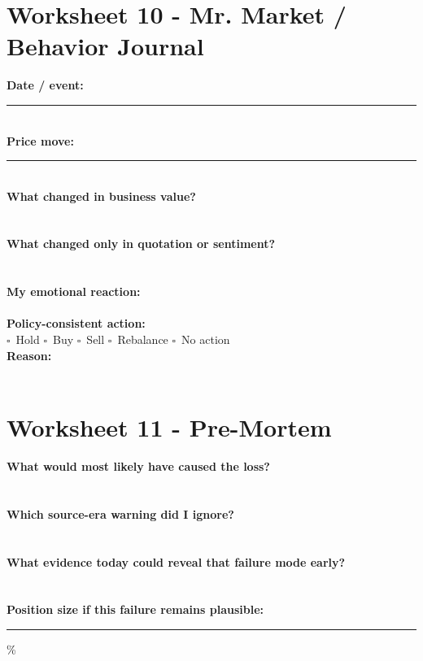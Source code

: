 \documentclass[11pt]{article}
\newcommand{\checkbox}{\(\square\)}
\newcommand{\blankline}{\makebox[\linewidth][l]{\rule{0.96\linewidth}{0.35pt}}}
\begin{document}
\section{Worksheet 10 - Mr. Market / Behavior Journal}
\begin{worksheetbox}
\textbf{Date / event:} \rule{0.72\linewidth}{0.35pt}\\[8pt]
\textbf{Price move:} \rule{0.74\linewidth}{0.35pt}\\[8pt]
\textbf{What changed in business value?}\\[4pt]\blankline\\[10pt]\blankline\\[10pt]
\textbf{What changed only in quotation or sentiment?}\\[4pt]\blankline\\[10pt]\blankline\\[10pt]
\textbf{My emotional reaction:}\\[4pt]\blankline\\[10pt]
\textbf{Policy-consistent action:}\\[4pt]\checkbox\ Hold \quad \checkbox\ Buy \quad \checkbox\ Sell \quad \checkbox\ Rebalance \quad \checkbox\ No action\\[8pt]
\textbf{Reason:}\\[4pt]\blankline\\[10pt]\blankline
\end{worksheetbox}

\section{Worksheet 11 - Pre-Mortem}
\begin{worksheetbox}\raggedright
\textbf{What would most likely have caused the loss?}\\[4pt]\blankline\\[10pt]\blankline\\[10pt]
\textbf{Which source-era warning did I ignore?}\\[4pt]\blankline\\[10pt]\blankline\\[10pt]
\textbf{What evidence today could reveal that failure mode early?}\\[4pt]\blankline\\[10pt]\blankline\\[10pt]
\textbf{Position size if this failure remains plausible:} \rule{1.4in}{0.35pt}\%\\[8pt]
\end{worksheetbox}
\end{document}
